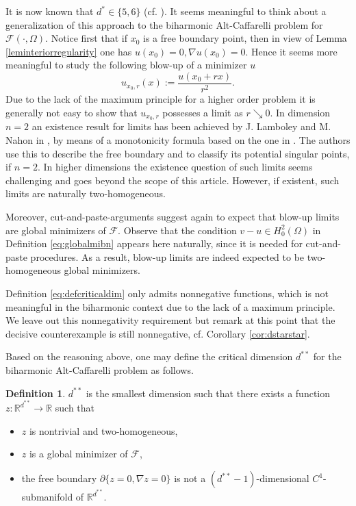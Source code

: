 \documentclass[twoside,11pt]{article}
\theoremstyle{definition}
\newtheorem{definition}{Definition}
\begin{document}
It is now known that $d^* \in \{ 5,6 \}$ (cf. \cite{Velichkov,dstar1,dstar2,dstar3}). 
It seems meaningful to think about a generalization of this approach to the biharmonic Alt-Caffarelli problem for $\mathcal{F}(\cdot, \Omega)$. Notice first that if $x_0$ is a free boundary point, then in view of Lemma  \ref{leminteriorregularity} one has $u(x_0)=0, \nabla u(x_0)= 0$. Hence it seems more meaningful to study the following blow-up of a minimizer $u$
\begin{equation}
    u_{x_0,r}(x) := \frac{u(x_0+ rx)}{r^2}. 
\end{equation}
Due to the lack of the maximum principle for a higher order problem it is generally not easy to show that $u_{x_0,r}$ possesses a limit as $r \searrow 0$. In dimension $n= 2$ an existence result for limits has been achieved by J. Lamboley and M. Nahon in \cite{Nahon}, by means of a monotonicity formula based on the one in \cite{DKV20}. 
The authors use this to describe the free boundary and to classify its potential singular points, if $n=2$.
In higher dimensions the existence question of such limits seems challenging and goes beyond the scope of this article. However, if existent, such limits are naturally two-homogeneous.



Moreover, cut-and-paste-arguments suggest again to expect that blow-up limits are global minimizers of $\mathcal{F}$. Observe that the condition $v-u \in H_0^2(\Omega)$ in Definition \ref{eq:globalmibn} appears here naturally, since it is needed for cut-and-paste procedures. As a result, blow-up limits are indeed expected to be two-homogeneous global minimizers.




Definition \ref{eq:defcriticaldim} only admits nonnegative functions, which is  not meaningful in the biharmonic context due to the lack of a maximum principle.  
We leave out this nonnegativity requirement but remark at this point that 
 the decisive counterexample is still nonnegative, cf. Corollary \ref{cor:dstarstar}.  


Based on the reasoning above, one may define
the critical dimension $d^{**}$ for the biharmonic Alt-Caffarelli problem as follows. 

\begin{definition}\label{eq:defcriticaldimbih} $d^{**}$ is the smallest dimension such that there exists a function $z: \mathbb{R}^{d^{**}} \rightarrow \mathbb{R}$ such that 
\begin{itemize}
    \item[(i)] $z$ is nontrivial and two-homogeneous,
    \item[(ii)] $z$ is a global minimizer of $\mathcal{F}$,
    \item[(iii)] the 
    free boundary $\partial \{ z = 0, \nabla z = 0 \}$ is not a $(d^{**}-1)$-dimensional $C^1$-submanifold of $\mathbb{R}^{d^{**}}$. 
\end{itemize}
\end{definition}
\end{document}
